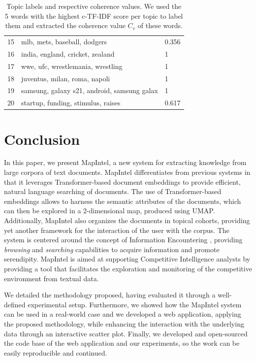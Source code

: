 \documentclass[a4paper]{article}
\begin{document}
\begin{table}[H]
{\begin{tabular}{@{}Sll@{}}
      15                          & mlb, mets, baseball, dodgers                  & 0.356                         \\
      16                          & india, england, cricket, zealand              & 1                             \\
      17                          & wwe, ufc, wrestlemania, wrestling             & 1                             \\
      18                          & juventus, milan, roma, napoli                 & 1                             \\
      19                          & samsung, galaxy s21, android, samsung galax   & 1                             \\
      20                          & startup, funding, stimulus, raises            & 0.617                         \\  \bottomrule
    \end{tabular}%
  }
  \caption{Topic labels and respective coherence values. We used the 5 words with the highest c-TF-IDF score per topic to label them and extracted the coherence value $C_v$ of these words.}
  \label{topic_labels}
\end{table}

\section{Conclusion}
In this paper, we present MapIntel, a new system for extracting knowledge from large corpora of text documents. MapIntel differentiates from previous systems in that it leverages Transformer-based document embeddings to provide efficient, natural language searching of documents. The use of Transformer-based embeddings allows to harness the semantic attributes of the documents, which can then be explored in a 2-dimensional map, produced using UMAP. Additionally, MapIntel also organizes the documents in topical cohorts, providing yet another framework for the interaction of the user with the corpus. The system is centered around the concept of Information Encountering \citet{erdelez2020}, providing \emph{browsing} and \emph{searching} capabilities to acquire information and promote serendipity. MapIntel is aimed at supporting Competitive Intelligence analysts by providing a tool that facilitates the exploration and monitoring of the competitive environment from textual data.

We detailed the methodology proposed, having evaluated it through a well-defined experimental setup. Furthermore, we showed how the MapIntel system can be used in a real-world case and we developed a web application, applying the proposed methodology, while enhancing the interaction with the underlying data through an interactive scatter plot. Finally, we developed and open-sourced the code base of the web application and our experiments, so the work can be easily reproducible and continued.
\end{document}
